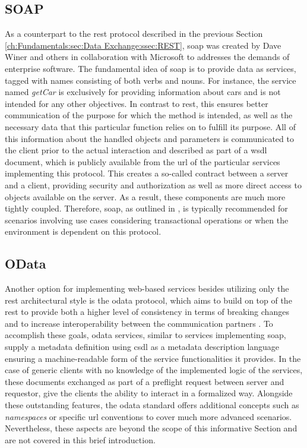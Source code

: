 \subsection{SOAP}
\label{ch:Fundamentals:sec:Data Exchange:ssec:SOAP}

As a counterpart to the \acrshort{rest} protocol described in the previous Section \ref{ch:Fundamentals:sec:Data Exchange:ssec:REST}, \acrshort{soap} was created by Dave Winer and others in collaboration with Microsoft \cite{patni_pro_2017} to addresses the demands of enterprise software.
The fundamental idea of \acrshort{soap} is to provide data as services, tagged with names consisting of both verbs and nouns. For instance, the service named \textit{getCar} is exclusively for providing information about cars and is not intended for any other objectives.
In contrast to \acrshort{rest}, this ensures better communication of the purpose for which the method is intended, as well as the necessary data that this particular function relies on to fulfill its purpose. All of this information about the handled objects and parameters is communicated to the client prior to the actual interaction and described as part of a \acrfull{wsdl} document, which is publicly available from the \acrshort{url} of the particular services implementing this protocol.
This creates a so-called contract between a server and a client, providing security and authorization as well as more direct access to objects available on the server. As a result, these components are much more tightly coupled.
Therefore, \acrshort{soap}, as outlined in \cite[4]{patni_pro_2017}, is typically recommended for scenarios involving use cases considering transactional operations or when the environment is dependent on this protocol.

\subsection{OData}
\label{ch:Fundamentals:sec:Data Exchange:ssec:OData}

Another option for implementing web-based services besides utilizing only the \acrshort{rest} architectural style is the \acrshort{odata} protocol, which aims to build on top of the \acrshort{rest} to provide both a higher level of consistency in terms of breaking changes and to increase interoperability between the communication partners \cite{noauthor_documentation_nodate}.
To accomplish these goals, \acrshort{odata} services, similar to services implementing \acrshort{soap}, supply a metadata definition using \acrfull{csdl} as a metadata description language ensuring a machine-readable form of the service functionalities it provides.
In the case of generic clients with no knowledge of the implemented logic of the services, these documents exchanged as part of a preflight request between server and requestor, give the clients the ability to interact in a formalized way.
Alongside these outstanding features, the \acrshort{odata} standard offers additional concepts such as \textit{namespaces} or specific \acrshort{url} conventions to cover much more advanced scenarios. 
Nevertheless, these aspects are beyond the scope of this informative Section and are not covered in this brief introduction.

